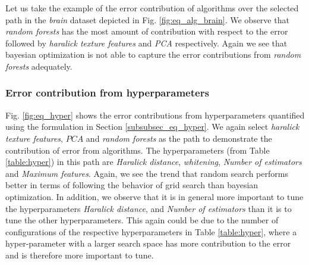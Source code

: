 Let us take the example of the error contribution of algorithms over the selected path in the \textit{brain} dataset depicted in Fig. \ref{fig:eq_alg_brain}. We observe that \textit{random forests} has the most amount of contribution with respect to the error followed by \textit{haralick texture features} and \textit{PCA} respectively. Again we see that bayesian optimization is not able to capture the error contributions from \textit{random forests} adequately.

\subsubsection{Error contribution from hyperparameters}

Fig. \ref{fig:eq_hyper} shows the error contributions from hyperparameters quantified using the formulation in Section \ref{subsubsec_eq_hyper}. We again select \textit{haralick texture features}, $PCA$ and \textit{random forests} as the path to demonstrate the contribution of error from algorithms. The hyperparameters (from Table \ref{table:hyper}) in this path are \textit{Haralick distance}, \textit{whitening}, \textit{Number of estimators} and \textit{Maximum features}. Again, we see the trend that random search performs better in terms of following the behavior of grid search than bayesian optimization. In addition, we observe that it is in general more important to tune the hyperparameters \textit{Haralick distance}, and \textit{Number of estimators} than it is to tune  the other hyperparameters. This again could be due to the number of configurations of the respective hyperparameters in Table \ref{table:hyper}, where a hyper-parameter with a larger search space has more contribution to the error and is therefore more important to tune.

